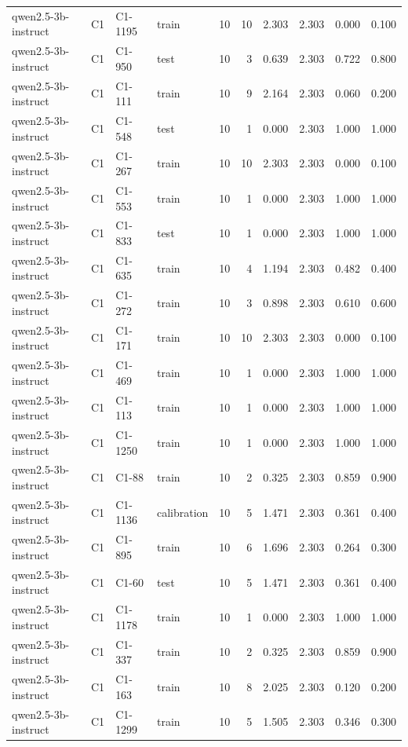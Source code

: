 \begin{table}
\begin{tabular}{llllrrrrrr}
qwen2.5-3b-instruct & C1 & C1-1195 & train & 10 & 10 & 2.303 & 2.303 & 0.000 & 0.100 \\
qwen2.5-3b-instruct & C1 & C1-950 & test & 10 & 3 & 0.639 & 2.303 & 0.722 & 0.800 \\
qwen2.5-3b-instruct & C1 & C1-111 & train & 10 & 9 & 2.164 & 2.303 & 0.060 & 0.200 \\
qwen2.5-3b-instruct & C1 & C1-548 & test & 10 & 1 & 0.000 & 2.303 & 1.000 & 1.000 \\
qwen2.5-3b-instruct & C1 & C1-267 & train & 10 & 10 & 2.303 & 2.303 & 0.000 & 0.100 \\
qwen2.5-3b-instruct & C1 & C1-553 & train & 10 & 1 & 0.000 & 2.303 & 1.000 & 1.000 \\
qwen2.5-3b-instruct & C1 & C1-833 & test & 10 & 1 & 0.000 & 2.303 & 1.000 & 1.000 \\
qwen2.5-3b-instruct & C1 & C1-635 & train & 10 & 4 & 1.194 & 2.303 & 0.482 & 0.400 \\
qwen2.5-3b-instruct & C1 & C1-272 & train & 10 & 3 & 0.898 & 2.303 & 0.610 & 0.600 \\
qwen2.5-3b-instruct & C1 & C1-171 & train & 10 & 10 & 2.303 & 2.303 & 0.000 & 0.100 \\
qwen2.5-3b-instruct & C1 & C1-469 & train & 10 & 1 & 0.000 & 2.303 & 1.000 & 1.000 \\
qwen2.5-3b-instruct & C1 & C1-113 & train & 10 & 1 & 0.000 & 2.303 & 1.000 & 1.000 \\
qwen2.5-3b-instruct & C1 & C1-1250 & train & 10 & 1 & 0.000 & 2.303 & 1.000 & 1.000 \\
qwen2.5-3b-instruct & C1 & C1-88 & train & 10 & 2 & 0.325 & 2.303 & 0.859 & 0.900 \\
qwen2.5-3b-instruct & C1 & C1-1136 & calibration & 10 & 5 & 1.471 & 2.303 & 0.361 & 0.400 \\
qwen2.5-3b-instruct & C1 & C1-895 & train & 10 & 6 & 1.696 & 2.303 & 0.264 & 0.300 \\
qwen2.5-3b-instruct & C1 & C1-60 & test & 10 & 5 & 1.471 & 2.303 & 0.361 & 0.400 \\
qwen2.5-3b-instruct & C1 & C1-1178 & train & 10 & 1 & 0.000 & 2.303 & 1.000 & 1.000 \\
qwen2.5-3b-instruct & C1 & C1-337 & train & 10 & 2 & 0.325 & 2.303 & 0.859 & 0.900 \\
qwen2.5-3b-instruct & C1 & C1-163 & train & 10 & 8 & 2.025 & 2.303 & 0.120 & 0.200 \\
qwen2.5-3b-instruct & C1 & C1-1299 & train & 10 & 5 & 1.505 & 2.303 & 0.346 & 0.300 \\

\end{tabular}
\end{table}
